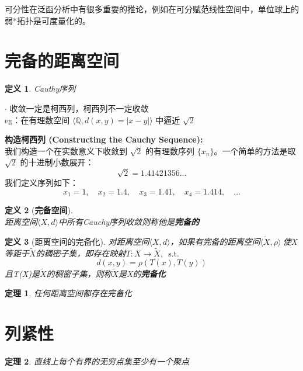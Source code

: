 \documentclass[12pt, a4paper, oneside, fontset=windows]{ctexbook}
\newtheorem{theorem}{定理}[section]
\newtheorem{definition}{定义}[section]
\DeclareMathOperator{\st}{\mathrm{s.t.}}
\begin{document}
可分性在泛函分析中有很多重要的推论，例如在可分赋范线性空间中，单位球上的弱*拓扑是可度量化的。

    \section{完备的距离空间}

    \begin{definition}
        Cauthy序列
    \end{definition}

    $\cdot$ 收敛一定是柯西列，柯西列不一定收敛\\

    eg：在有理数空间 $\langle \mathbb{Q}, d(x, y) = |x - y| \rangle$ 中逼近 $\sqrt{2}$

    \textbf{构造柯西列 (Constructing the Cauchy Sequence):} \\
    我们构造一个在实数意义下收敛到 $\sqrt{2}$ 的有理数序列 $\{x_n\}$。一个简单的方法是取 $\sqrt{2}$ 的十进制小数展开：
    $$ \sqrt{2} = 1.41421356\dots $$
    我们定义序列如下：
    $$ x_1 = 1, \quad x_2 = 1.4, \quad x_3 = 1.41, \quad x_4 = 1.414, \quad \dots $$


    \begin{definition}[\bf 完备空间]
        \ \\距离空间$\langle X,d \rangle$中所有Cauchy序列收敛则称他是\textbf{完备的}
    \end{definition}

    \begin{definition}[距离空间的完备化]
        对距离空间$\langle X,d \rangle$，如果有完备的距离空间$\langle \widetilde{X}, \rho \rangle\ $使X等距于$\widetilde{X} $的稠密子集，即存在映射$T:X\to \widetilde{X},\ \st $
        \[
            d(x,y)=\rho (T(x),T(y))
        \]
        且T(X)是$\widetilde{X} $的稠密子集，则称$\widetilde{X} $是X的\textbf{完备化}
    \end{definition}

    \begin{theorem}
        任何距离空间都存在完备化
    \end{theorem}


    \section{列紧性}
    \begin{theorem}
        直线上每个有界的无穷点集至少有一个聚点
    \end{theorem}
\end{document}
